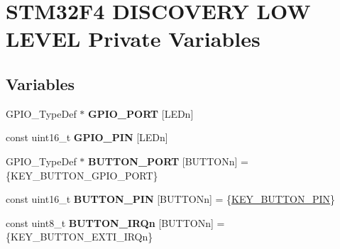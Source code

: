 \hypertarget{group___s_t_m32_f4___d_i_s_c_o_v_e_r_y___l_o_w___l_e_v_e_l___private___variables}{}\section{S\+T\+M32\+F4 D\+I\+S\+C\+O\+V\+E\+RY L\+OW L\+E\+V\+EL Private Variables}
\label{group___s_t_m32_f4___d_i_s_c_o_v_e_r_y___l_o_w___l_e_v_e_l___private___variables}
\subsection*{Variables}
\begin{DoxyCompactItemize}
\item 
G\+P\+I\+O\+\_\+\+Type\+Def $\ast$ {\bfseries G\+P\+I\+O\+\_\+\+P\+O\+RT} \mbox{[}L\+E\+Dn\mbox{]}
\item 
const uint16\+\_\+t {\bfseries G\+P\+I\+O\+\_\+\+P\+IN} \mbox{[}L\+E\+Dn\mbox{]}
\item 
\mbox{\label{group___s_t_m32_f4___d_i_s_c_o_v_e_r_y___l_o_w___l_e_v_e_l___private___variables_gad63ed42b4071e78f80f7462227da4f35}} 
G\+P\+I\+O\+\_\+\+Type\+Def $\ast$ {\bfseries B\+U\+T\+T\+O\+N\+\_\+\+P\+O\+RT} \mbox{[}B\+U\+T\+T\+O\+Nn\mbox{]} = \{K\+E\+Y\+\_\+\+B\+U\+T\+T\+O\+N\+\_\+\+G\+P\+I\+O\+\_\+\+P\+O\+RT\}
\item 
\mbox{\label{group___s_t_m32_f4___d_i_s_c_o_v_e_r_y___l_o_w___l_e_v_e_l___private___variables_gadf78f2d71408a01f8d30929c2d2da82b}} 
const uint16\+\_\+t {\bfseries B\+U\+T\+T\+O\+N\+\_\+\+P\+IN} \mbox{[}B\+U\+T\+T\+O\+Nn\mbox{]} = \{\mbox{\hyperlink{group___s_t_m32_f4___d_i_s_c_o_v_e_r_y___l_o_w___l_e_v_e_l___b_u_t_t_o_n_ga5c260a4b4e26836dc3a9b6f15d317421}{K\+E\+Y\+\_\+\+B\+U\+T\+T\+O\+N\+\_\+\+P\+IN}}\}
\item 
\mbox{\label{group___s_t_m32_f4___d_i_s_c_o_v_e_r_y___l_o_w___l_e_v_e_l___private___variables_ga13c3e27c584df9fccc4697dd535ea1cd}} 
const uint8\+\_\+t {\bfseries B\+U\+T\+T\+O\+N\+\_\+\+I\+R\+Qn} \mbox{[}B\+U\+T\+T\+O\+Nn\mbox{]} = \{K\+E\+Y\+\_\+\+B\+U\+T\+T\+O\+N\+\_\+\+E\+X\+T\+I\+\_\+\+I\+R\+Qn\}

\end{DoxyCompactItemize}
